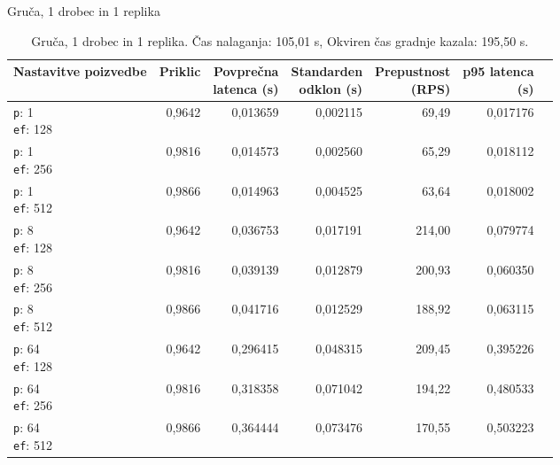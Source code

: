 \begin{table}[htbp]
  \centering
\small
  \caption{Gruča, 1 drobec in 1 replika}
  \label{tab:cluster-2cpu-4ram:tenant:s1-r1:qdrant-dipl-sharding-1-shard-1-replica-tenant-m-16-ef-128-random-768-100-tenants-extended-upload-2026-08-17-17-00-19.json}
  \begin{tabularx}{\textwidth}{Xrrrrrr}
    \toprule
    Nastavitve poizvedbe & Priklic & \makecell{Povprečna\\latenca (s)} & \makecell{Standarden\\odklon (s)} & \makecell{Prepustnost\\(RPS)} & \makecell{p95 latenca\\(s)}  \\
    \midrule
    \makecell{\texttt{p}: 1\\\texttt{ef}: 128} & 0,9642 & 0,013659 & 0,002115 & 69,49 & 0,017176 \\
    \makecell{\texttt{p}: 1\\\texttt{ef}: 256} & 0,9816 & 0,014573 & 0,002560 & 65,29 & 0,018112 \\
    \makecell{\texttt{p}: 1\\\texttt{ef}: 512} & 0,9866 & 0,014963 & 0,004525 & 63,64 & 0,018002 \\
    \makecell{\texttt{p}: 8\\\texttt{ef}: 128} & 0,9642 & 0,036753 & 0,017191 & 214,00 & 0,079774 \\
    \makecell{\texttt{p}: 8\\\texttt{ef}: 256} & 0,9816 & 0,039139 & 0,012879 & 200,93 & 0,060350 \\
    \makecell{\texttt{p}: 8\\\texttt{ef}: 512} & 0,9866 & 0,041716 & 0,012529 & 188,92 & 0,063115 \\
    \makecell{\texttt{p}: 64\\\texttt{ef}: 128} & 0,9642 & 0,296415 & 0,048315 & 209,45 & 0,395226 \\
    \makecell{\texttt{p}: 64\\\texttt{ef}: 256} & 0,9816 & 0,318358 & 0,071042 & 194,22 & 0,480533 \\
    \makecell{\texttt{p}: 64\\\texttt{ef}: 512} & 0,9866 & 0,364444 & 0,073476 & 170,55 & 0,503223 \\
    \bottomrule
  \end{tabularx}
\caption* {Gruča, 1 drobec in 1 replika. Čas nalaganja: 105,01 s, Okviren čas gradnje kazala: 195,50 s.}\end{table}

